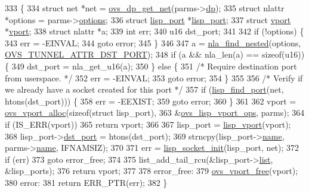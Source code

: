 \begin{DoxyCode}
333 \{
334     \textcolor{keyword}{struct }net *net = \hyperlink{datapath_8h_aef2302004ca1f45133eaef00bb3740eb}{ovs\_dp\_get\_net}(parms->\hyperlink{structvport__parms_a15faa866e3d35a721de77b347017499e}{dp});
335     \textcolor{keyword}{struct }nlattr *options = parms->\hyperlink{structvport__parms_a5c6027e758731e1a16968e77d4e2ca7c}{options};
336     \textcolor{keyword}{struct }\hyperlink{structlisp__port}{lisp\_port} *\hyperlink{structlisp__port}{lisp\_port};
337     \textcolor{keyword}{struct }\hyperlink{structvport}{vport} *\hyperlink{structvport}{vport};
338     \textcolor{keyword}{struct }nlattr *a;
339     \textcolor{keywordtype}{int} err;
340     u16 dst\_port;
341 
342     \textcolor{keywordflow}{if} (!options) \{
343         err = -EINVAL;
344         \textcolor{keywordflow}{goto} error;
345     \}
346 
347     a = \hyperlink{net_2netlink_8h_a5b73cd8f4a1d3d335642ee1492b7b2c2}{nla\_find\_nested}(options, \hyperlink{openvswitch_8h_a96a58e29e8dbf2b5bdeb775cba46556eae2bec9320cf2cc32228c9783e1bba39a}{OVS\_TUNNEL\_ATTR\_DST\_PORT});
348     \textcolor{keywordflow}{if} (a && nla\_len(a) == \textcolor{keyword}{sizeof}(u16)) \{
349         dst\_port = nla\_get\_u16(a);
350     \} \textcolor{keywordflow}{else} \{
351         \textcolor{comment}{/* Require destination port from userspace. */}
352         err = -EINVAL;
353         \textcolor{keywordflow}{goto} error;
354     \}
355 
356     \textcolor{comment}{/* Verify if we already have a socket created for this port */}
357     \textcolor{keywordflow}{if} (\hyperlink{linux_2vport-lisp_8c_ac170aebcefa72b3bccd6431da43de59d}{lisp\_find\_port}(net, htons(dst\_port))) \{
358         err = -EEXIST;
359         \textcolor{keywordflow}{goto} error;
360     \}
361 
362     vport = \hyperlink{linux_2vport_8c_a9198ee06111592d2cf6c3b2bf94561c1}{ovs\_vport\_alloc}(\textcolor{keyword}{sizeof}(\textcolor{keyword}{struct} lisp\_port),
363                 &\hyperlink{linux_2vport-lisp_8c_a758306cfbd9fe092cc094dbf165e5cf7}{ovs\_lisp\_vport\_ops}, parms);
364     \textcolor{keywordflow}{if} (IS\_ERR(vport))
365         \textcolor{keywordflow}{return} vport;
366 
367     lisp\_port = \hyperlink{linux_2vport-lisp_8c_af8f69fb0b9db12e9a324a9932011b302}{lisp\_vport}(vport);
368     lisp\_port->\hyperlink{structlisp__port_a3f0943c0da5e5c60f9e8e4068d49215e}{dst\_port} = htons(dst\_port);
369     strncpy(lisp\_port->\hyperlink{structlisp__port_ae0a7f15d977897e051bb338429f1d7fe}{name}, parms->\hyperlink{structvport__parms_a4f27e2a7b7dc0493c095cdaabe225b38}{name}, IFNAMSIZ);
370 
371     err = \hyperlink{linux_2vport-lisp_8c_a91b2b04c344bf1a50d02d4084fabf482}{lisp\_socket\_init}(lisp\_port, net);
372     \textcolor{keywordflow}{if} (err)
373         \textcolor{keywordflow}{goto} error\_free;
374 
375     list\_add\_tail\_rcu(&lisp\_port->\hyperlink{structlisp__port_adaf751d0e165cfbf047be71e680c3f19}{list}, &lisp\_ports);
376     \textcolor{keywordflow}{return} vport;
377 
378 error\_free:
379     \hyperlink{linux_2vport_8c_a17e57e95b47bad0bcf00e2e2805e2170}{ovs\_vport\_free}(vport);
380 error:
381     \textcolor{keywordflow}{return} ERR\_PTR(err);
382 \}
\end{DoxyCode}
